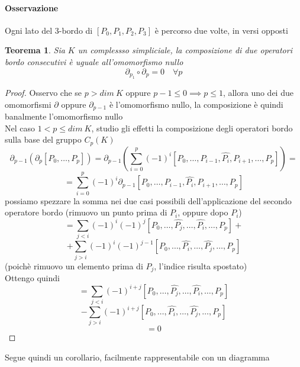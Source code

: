 \documentclass[a4paper]{report}
\newtheorem{theorem}{Teorema}
\begin{document}
\paragraph{Osservazione} Ogni lato del 3-bordo di $[P_0,P_1,P_2,P_3]$ è percorso due volte, in versi opposti
\begin{theorem}
    Sia $K$ un complessso simpliciale, la composizione di due operatori bordo consecutivi è uguale all'omomorfismo nullo
    \[
        \partial_{p_1}\circ\partial_p=0\quad\forall p
    \]
\end{theorem}
\begin{proof}
    Osservo che se $p>dim\ K$ oppure $p-1\leq 0\implies p\leq 1$, allora uno dei due omomorfismi $\partial$ oppure $\partial_{p-1}$ è l'omomorfismo nullo, la composizione è quindi banalmente l'omomorfismo nullo\\
    Nel caso $1<p\leq dim\ K$, studio gli effetti la composizione degli operatori bordo sulla base del gruppo $C_p(K)$
    \[
        \partial_{p-1}\left(\partial_p[P_0,\dots,P_p]\right)=\partial_{p-1}\left(\sum_{i=0}^p(-1)^i[P_0,\dots,P_{i-1},\hat{P_i},P_{i+1},\dots,P_p]\right)=
    \]
    \[
        =\sum_{i=0}^p(-1)^i\partial_{p-1}[P_0,\dots,P_{i-1},\hat{P_i},P_{i+1},\dots,P_p]
    \]
    possiamo spezzare la somma nei due casi possibili dell'applicazione del secondo operatore bordo (rimuovo un punto prima di $P_i$, oppure dopo $P_i$)
    \[
        =\sum_{j<i}(-1)^i(-1)^j[P_0,\dots,\hat{P_j},\dots,\hat{P_i},\dots,P_p]+
    \]
    \[
        +\sum_{j>i}(-1)^i(-1)^{j-1}[P_0,\dots,\hat{P_i},\dots,\hat{P_j},\dots,P_p]
    \]
    (poichè rimuovo un elemento prima di $P_j$, l'indice risulta spostato)\\
    Ottengo quindi
    \[
        =\sum_{j<i}(-1)^{i+j}[P_0,\dots,\hat{P_j},\dots,\hat{P_i},\dots,P_p]
    \]
    \[
        -\sum_{j>i}(-1)^{i+j}[P_0,\dots,\hat{P_i},\dots,\hat{P_j},\dots,P_p]
    \]
    \[
        =0
    \]
\end{proof}
Segue quindi un corollario, facilmente rappresentabile con un diagramma
\pagebreak
\end{document}
